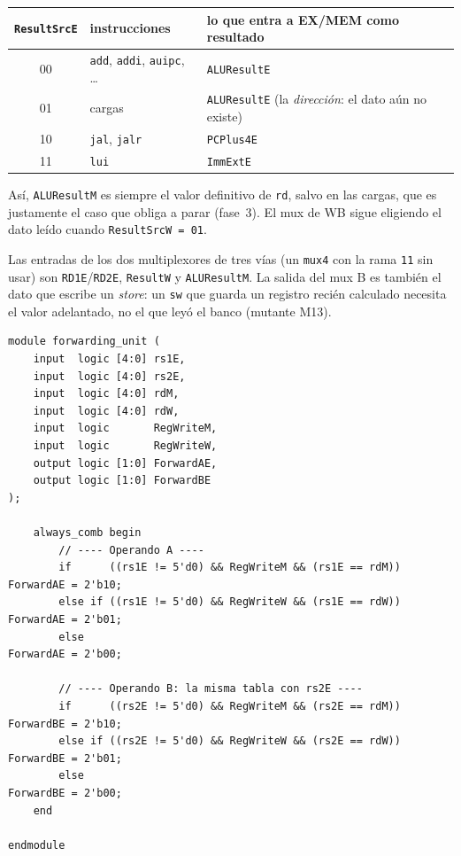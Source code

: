 \documentclass[11pt,letterpaper]{article}
\newcommand{\cod}[1]{\texttt{#1}}
\begin{document}
\begin{center}\small
\begin{tabular}{@{}c l l@{}}
\toprule
\cod{ResultSrcE} & instrucciones & lo que entra a EX/MEM como resultado \\
\midrule
00 & \cod{add}, \cod{addi}, \cod{auipc}, \ldots & \cod{ALUResultE} \\
01 & cargas & \cod{ALUResultE} (la \emph{direcci\'on}: el dato a\'un no existe) \\
10 & \cod{jal}, \cod{jalr} & \cod{PCPlus4E} \\
11 & \cod{lui} & \cod{ImmExtE} \\
\bottomrule
\end{tabular}
\end{center}
As\'i, \cod{ALUResultM} es siempre el valor definitivo de \cod{rd}, salvo en las cargas, que es
justamente el caso que obliga a parar (fase~3). El mux de WB sigue eligiendo el dato le\'ido cuando
\cod{ResultSrcW = 01}.

Las entradas de los dos multiplexores de tres v\'ias (un \cod{mux4} con la rama \cod{11} sin usar) son
\cod{RD1E}/\cod{RD2E}, \cod{ResultW} y \cod{ALUResultM}. La salida del mux B es tambi\'en el dato que
escribe un \emph{store}: un \cod{sw} que guarda un registro reci\'en calculado necesita el valor
adelantado, no el que ley\'o el banco (mutante M13).

\begin{lstlisting}[language=SV,title={\small\ttfamily rtl/forwarding\_unit.sv}]
module forwarding_unit (
    input  logic [4:0] rs1E,
    input  logic [4:0] rs2E,
    input  logic [4:0] rdM,
    input  logic [4:0] rdW,
    input  logic       RegWriteM,
    input  logic       RegWriteW,
    output logic [1:0] ForwardAE,
    output logic [1:0] ForwardBE
);

    always_comb begin
        // ---- Operando A ----
        if      ((rs1E != 5'd0) && RegWriteM && (rs1E == rdM)) ForwardAE = 2'b10;
        else if ((rs1E != 5'd0) && RegWriteW && (rs1E == rdW)) ForwardAE = 2'b01;
        else                                                   ForwardAE = 2'b00;

        // ---- Operando B: la misma tabla con rs2E ----
        if      ((rs2E != 5'd0) && RegWriteM && (rs2E == rdM)) ForwardBE = 2'b10;
        else if ((rs2E != 5'd0) && RegWriteW && (rs2E == rdW)) ForwardBE = 2'b01;
        else                                                   ForwardBE = 2'b00;
    end

endmodule
\end{lstlisting}
\end{document}
